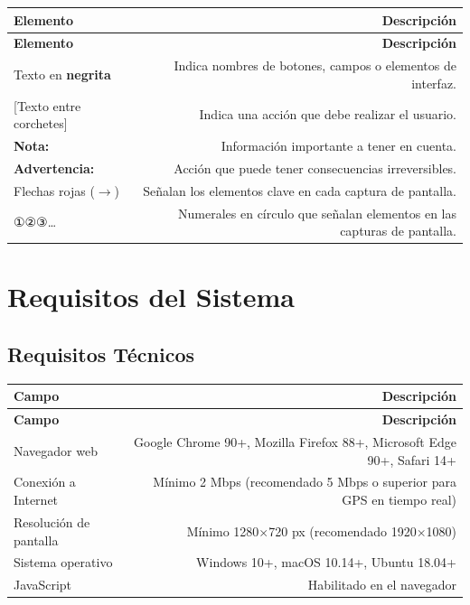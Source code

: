 \documentclass[12pt,a4paper]{article}
\begin{document}
\begin{longtable}{LR}
  \toprule
  \textbf{Elemento} & \textbf{Descripción} \\
  \midrule
  \endfirsthead
  \toprule
  \textbf{Elemento} & \textbf{Descripción} \\
  \midrule
  \endhead
  \bottomrule
  \endfoot
  Texto en \textbf{negrita}   & Indica nombres de botones, campos o elementos de interfaz. \\[4pt]
  {[}Texto entre corchetes{]} & Indica una acción que debe realizar el usuario. \\[4pt]
  \textbf{Nota:}              & Información importante a tener en cuenta. \\[4pt]
  \textbf{Advertencia:}       & Acción que puede tener consecuencias irreversibles. \\[4pt]
  Flechas rojas ($\rightarrow$) & Señalan los elementos clave en cada captura de pantalla. \\[4pt]
  ①②③\ldots               & Numerales en círculo que señalan elementos en las capturas de pantalla. \\
\end{longtable}

\section{Requisitos del Sistema}

\subsection{Requisitos Técnicos}

\begin{longtable}{LR}
  \toprule
  \textbf{Campo} & \textbf{Descripción} \\
  \midrule
  \endfirsthead
  \toprule
  \textbf{Campo} & \textbf{Descripción} \\
  \midrule
  \endhead
  \bottomrule
  \endfoot
  Navegador web        & Google Chrome 90+, Mozilla Firefox 88+, Microsoft Edge 90+, Safari 14+ \\[4pt]
  Conexión a Internet  & Mínimo 2 Mbps (recomendado 5 Mbps o superior para GPS en tiempo real) \\[4pt]
  Resolución de pantalla & Mínimo 1280$\times$720 px (recomendado 1920$\times$1080) \\[4pt]
  Sistema operativo    & Windows 10+, macOS 10.14+, Ubuntu 18.04+ \\[4pt]
  JavaScript           & Habilitado en el navegador \\
\end{longtable}
\end{document}
